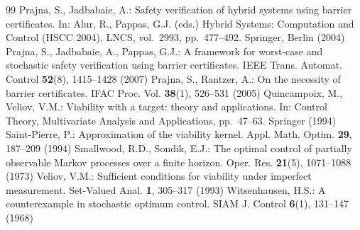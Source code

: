 \documentclass[11pt,a4paper]{article}
\theoremstyle{plain}
\theoremstyle{definition}
\theoremstyle{remark}
\begin{document}
\begin{thebibliography}{99}
 Prajna, S., Jadbabaie, A.: Safety verification of hybrid systems using barrier certificates. In: Alur, R., Pappas, G.J. (eds.) Hybrid Systems: Computation and Control (HSCC 2004). LNCS, vol.~2993, pp.~477--492. Springer, Berlin (2004)
 Prajna, S., Jadbabaie, A., Pappas, G.J.: A framework for worst-case and stochastic safety verification using barrier certificates. IEEE Trans. Automat. Control \textbf{52}(8), 1415--1428 (2007)
 Prajna, S., Rantzer, A.: On the necessity of barrier certificates. IFAC Proc. Vol. \textbf{38}(1), 526--531 (2005)
 Quincampoix, M., Veliov, V.M.: Viability with a target: theory and applications. In: Control Theory, Multivariate Analysis and Applications, pp.~47--63. Springer (1994)
 Saint-Pierre, P.: Approximation of the viability kernel. Appl. Math. Optim. \textbf{29}, 187--209 (1994)
 Smallwood, R.D., Sondik, E.J.: The optimal control of partially observable Markov processes over a finite horizon. Oper. Res. \textbf{21}(5), 1071--1088 (1973)
 Veliov, V.M.: Sufficient conditions for viability under imperfect measurement. Set-Valued Anal. \textbf{1}, 305--317 (1993)
 Witsenhausen, H.S.: A counterexample in stochastic optimum control. SIAM J. Control \textbf{6}(1), 131--147 (1968)
\end{thebibliography}
\end{document}
